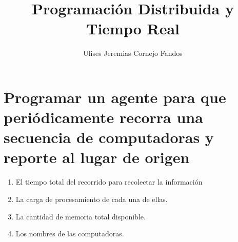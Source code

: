 \documentclass[osajnl,twocolumn,showpacs,superscriptaddress,10pt]{revtex4-1} %
\begin{document}
\title{Programación Distribuida y Tiempo Real}

\author{Ulises Jeremias Cornejo Fandos}

\maketitle %

\section{Programar un agente para que periódicamente recorra una secuencia de computadoras y reporte al lugar de origen}

\begin{enumerate}[label=\alph* -]
  \item El tiempo total del recorrido para recolectar la información
  \item La carga de procesamiento de cada una de ellas.
  \item La cantidad de memoria total disponible.
  \item Los nombres de las computadoras.
\end{enumerate}
\end{document}
